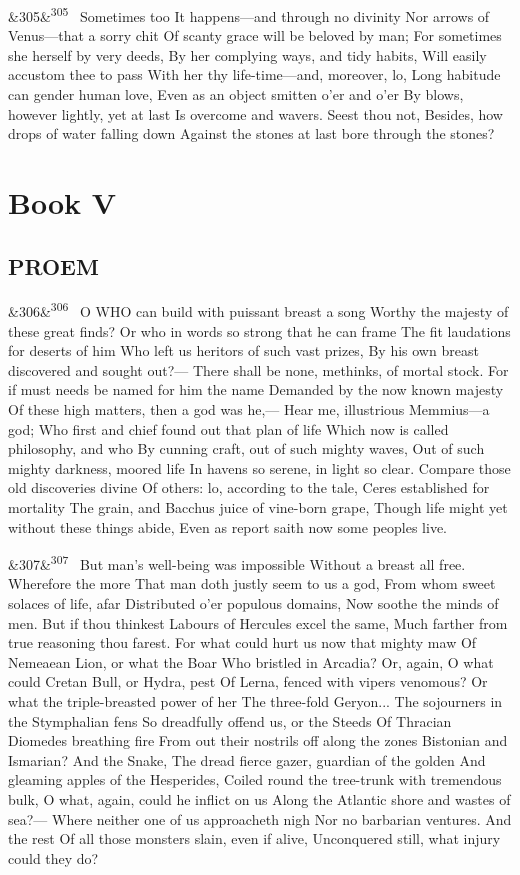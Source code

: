 \documentclass[12pt]{article}
\newcommand{\para}[1][]{\par\noindent\ifx&#1&\else\textsuperscript{\footnotesize #1}~\fi}
\begin{document}
\para[305] Sometimes too It happens---and through no divinity Nor arrows of Venus---that a sorry chit Of scanty grace will be beloved by man; For sometimes she herself by very deeds, By her complying ways, and tidy habits, Will easily accustom thee to pass With her thy life-time---and, moreover, lo, Long habitude can gender human love, Even as an object smitten o'er and o'er By blows, however lightly, yet at last Is overcome and wavers. Seest thou not, Besides, how drops of water falling down Against the stones at last bore through the stones?

\section*{Book V}

\subsection*{PROEM}

\para[306] O WHO can build with puissant breast a song Worthy the majesty of these great finds? Or who in words so strong that he can frame The fit laudations for deserts of him Who left us heritors of such vast prizes, By his own breast discovered and sought out?--- There shall be none, methinks, of mortal stock. For if must needs be named for him the name Demanded by the now known majesty Of these high matters, then a god was he,--- Hear me, illustrious Memmius---a god; Who first and chief found out that plan of life Which now is called philosophy, and who By cunning craft, out of such mighty waves, Out of such mighty darkness, moored life In havens so serene, in light so clear. Compare those old discoveries divine Of others: lo, according to the tale, Ceres established for mortality The grain, and Bacchus juice of vine-born grape, Though life might yet without these things abide, Even as report saith now some peoples live.

\para[307] But man's well-being was impossible Without a breast all free. Wherefore the more That man doth justly seem to us a god, From whom sweet solaces of life, afar Distributed o'er populous domains, Now soothe the minds of men. But if thou thinkest Labours of Hercules excel the same, Much farther from true reasoning thou farest. For what could hurt us now that mighty maw Of Nemeaean Lion, or what the Boar Who bristled in Arcadia? Or, again, O what could Cretan Bull, or Hydra, pest Of Lerna, fenced with vipers venomous? Or what the triple-breasted power of her The three-fold Geryon... The sojourners in the Stymphalian fens So dreadfully offend us, or the Steeds Of Thracian Diomedes breathing fire From out their nostrils off along the zones Bistonian and Ismarian? And the Snake, The dread fierce gazer, guardian of the golden And gleaming apples of the Hesperides, Coiled round the tree-trunk with tremendous bulk, O what, again, could he inflict on us Along the Atlantic shore and wastes of sea?--- Where neither one of us approacheth nigh Nor no barbarian ventures. And the rest Of all those monsters slain, even if alive, Unconquered still, what injury could they do?
\end{document}

